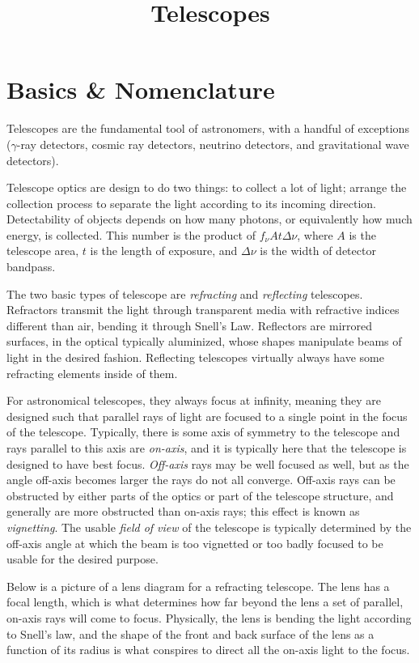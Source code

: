 \title{\bf Telescopes}

\section{Basics \& Nomenclature}

Telescopes are the fundamental tool of astronomers, with a handful of
exceptions ($\gamma$-ray detectors, cosmic ray detectors, neutrino
detectors, and gravitational wave detectors). 

Telescope optics are design to do two things: to collect a lot of
light; arrange the collection process to separate the light according
to its incoming direction. Detectability of objects depends on how
many photons, or equivalently how much energy, is collected. This
number is the product of $f_\nu A t \Delta\nu$, where $A$ is the
telescope area, $t$ is the length of exposure, and $\Delta\nu$ is the
width of detector bandpass.

The two basic types of telescope are {\it refracting} and {\it
reflecting} telescopes. Refractors transmit the light through
transparent media with refractive indices different than air, bending
it through Snell's Law. Reflectors are mirrored surfaces, in the
optical typically aluminized, whose shapes manipulate beams of light
in the desired fashion. Reflecting telescopes virtually always have
some refracting elements inside of them.

For astronomical telescopes, they always focus at infinity, meaning
they are designed such that parallel rays of light are focused to a
single point in the focus of the telescope.  Typically, there is some
axis of symmetry to the telescope and rays parallel to this axis are
{\it on-axis}, and it is typically here that the telescope is designed
to have best focus. {\it Off-axis} rays may be well focused as well,
but as the angle off-axis becomes larger the rays do not all
converge. Off-axis rays can be obstructed by either parts of the
optics or part of the telescope structure, and generally are more
obstructed than on-axis rays; this effect is known as {\it
vignetting}.  The usable {\it field of view} of the telescope is
typically determined by the off-axis angle at which the beam is too
vignetted or too badly focused to be usable for the desired purpose.

Below is a picture of a lens diagram for a refracting telescope. The
lens has a focal length, which is what determines how far beyond the
lens a set of parallel, on-axis rays will come to focus. Physically,
the lens is bending the light according to Snell's law, and the shape
of the front and back surface of the lens as a function of its radius
is what conspires to direct all the on-axis light to the focus.

